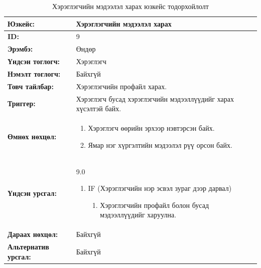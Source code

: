 \begin{table}[H]
    \caption{Хэрэглэгчийн мэдээлэл харах юзкейс тодорхойлолт}
    \begin{tabular}{|l|p{9cm}|}
		\hline
		{\bfseries Юзкейс:} & Хэрэглэгчийн мэдээлэл харах \\\hline
		{\bfseries ID:} & 9 \\\hline
		{\bfseries Эрэмбэ:} & Өндөр \\\hline
		{\bfseries Үндсэн тоглогч:} & Хэрэглэгч \\\hline
		{\bfseries Нэмэлт тоглогч:} & Байхгүй \\\hline
		{\bfseries Товч тайлбар:} & Хэрэглэгчийн профайл харах. \\\hline
		{\bfseries Триггер:} & Хэрэглэгч бусад хэрэглэгчийн мэдээллүүдийг харах хүсэлтэй байх. \\\hline
		{\bfseries Өмнөх нөхцөл:} &
		    \begin{enumerate}[nosep]
		        \item Хэрэглэгч өөрийн эрхээр нэвтэрсэн байх.
		        \item Ямар нэг хүргэлтийн мэдээлэл рүү орсон байх.
		    \end{enumerate}
		\\\hline
		{\bfseries Үндсэн урсгал:} &
			9.0
			\begin{enumerate}[nosep]
				\item IF (Хэрэглэгчийн нэр эсвэл зураг дээр дарвал)
				    \begin{enumerate}[nosep]
		                \item Хэрэглэгчийн профайл болон бусад мэдээллүүдийг харуулна.
				    \end{enumerate}
			\end{enumerate}
		\\\hline
		{\bfseries Дараах нөхцөл:} & Байхгүй \\\hline
		{\bfseries Альтернатив урсгал:} & Байхгүй \\\hline
    \end{tabular}
\end{table}

